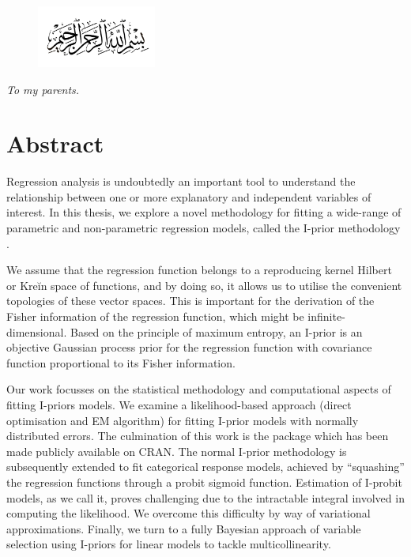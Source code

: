 \documentclass[11pt,twoside,openright]{report}
\begin{document}
\vspace*{5mm}
\begin{figure}[H]
  \centering
  \includegraphics[width=0.35\textwidth]{figure/bismillah}
\end{figure}
\vspace*{0.75cm}
\begin{center}
  \textit{To my parents.}
\end{center}

\chapter*{Abstract}

Regression analysis is undoubtedly an important tool to understand the relationship between one or more explanatory and independent variables of interest. 
In this thesis, we explore a novel methodology for fitting a wide-range of parametric and non-parametric regression models, called the I-prior methodology \citep{bergsma2017}. 

We assume that the regression function belongs to a reproducing kernel Hilbert or Kreĭn space of functions, and by doing so, it allows us to utilise the convenient topologies of these vector spaces. 
This is important for the derivation of the Fisher information of the regression function, which might be infinite-dimensional.
Based on the principle of maximum entropy, an I-prior is an objective Gaussian process prior for the regression function with covariance function proportional to its Fisher information. 

Our work focusses on the statistical methodology and computational aspects of fitting I-priors models. 
We examine a likelihood-based approach (direct optimisation and EM algorithm) for fitting I-prior models with normally distributed errors.
The culmination of this work is the  package  \citep{jamil2017iprior} which has been made publicly available on CRAN. 
The normal I-prior methodology is subsequently extended to fit categorical response models, achieved by ``squashing'' the regression functions through a probit sigmoid function.
Estimation of I-probit models, as we call it, proves challenging due to the intractable integral involved in computing the likelihood. 
We overcome this difficulty by way of variational approximations.
Finally, we turn to a fully Bayesian approach of variable selection using I-priors for linear models to tackle multicollinearity.
\end{document}

